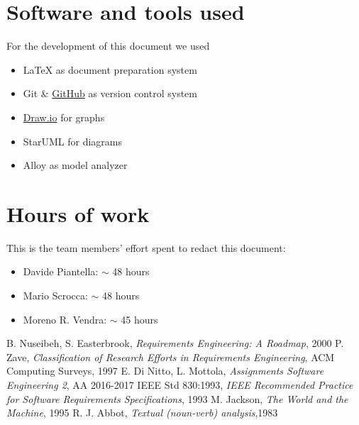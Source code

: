 \begin{appendices}
	\section{Software and tools used}
	For the development of this document we used
	\begin{itemize}
		\item \LaTeX{} as document preparation system
		\item Git \& \href{http://github.com}{GitHub} as version control system
		\item \href{http://draw.io}{Draw.io} for graphs
		\item StarUML for diagrams
		\item Alloy as model analyzer
	\end{itemize}
	
	\section{Hours of work}
	This is the team members' effort spent to redact this document:
	\begin{itemize}
		\item Davide Piantella: $\sim$ 48 hours
		\item Mario Scrocca: $\sim$ 48 hours
		\item Moreno R. Vendra: $\sim$ 45 hours
	\end{itemize}
\end{appendices}
\clearpage
\begin{thebibliography}{9}
B. Nuseibeh, S. Easterbrook, \emph{Requirements Engineering: A Roadmap}, 2000
P. Zave, \emph{Classification of Research Efforts in Requirements
Engineering}, ACM Computing Surveys, 1997
 E. Di Nitto, L. Mottola, \emph{Assignments Software Engineering 2}, AA 2016-2017
IEEE Std 830:1993, \emph{IEEE Recommended Practice for Software Requirements Specifications}, 1993
M. Jackson, \emph{The World and the Machine}, 1995
R. J. Abbot, \emph{Textual (noun-verb) analysis},1983
\end{thebibliography}